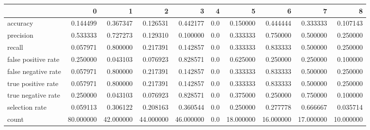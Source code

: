 \begin{tabular}{lrrrrrrrrr}
\toprule
{} &          0 &          1 &          2 &          3 &    4 &          5 &          6 &          7 &          8 \\
\midrule
accuracy            &   0.144499 &   0.367347 &   0.126531 &   0.442177 &  0.0 &   0.150000 &   0.444444 &   0.333333 &   0.107143 \\
precision           &   0.533333 &   0.727273 &   0.129310 &   0.100000 &  0.0 &   0.333333 &   0.750000 &   0.500000 &   0.250000 \\
recall              &   0.057971 &   0.800000 &   0.217391 &   0.142857 &  0.0 &   0.333333 &   0.833333 &   0.500000 &   0.250000 \\
false positive rate &   0.250000 &   0.043103 &   0.076923 &   0.828571 &  0.0 &   0.625000 &   0.250000 &   0.250000 &   0.100000 \\
false negative rate &   0.057971 &   0.800000 &   0.217391 &   0.142857 &  0.0 &   0.333333 &   0.833333 &   0.500000 &   0.250000 \\
true positive rate  &   0.057971 &   0.800000 &   0.217391 &   0.142857 &  0.0 &   0.333333 &   0.833333 &   0.500000 &   0.250000 \\
true negative rate  &   0.250000 &   0.043103 &   0.076923 &   0.828571 &  0.0 &   0.375000 &   0.250000 &   0.750000 &   0.100000 \\
selection rate      &   0.059113 &   0.306122 &   0.208163 &   0.360544 &  0.0 &   0.250000 &   0.277778 &   0.666667 &   0.035714 \\
count               &  80.000000 &  42.000000 &  44.000000 &  46.000000 &  0.0 &  18.000000 &  16.000000 &  17.000000 &  10.000000 \\
\bottomrule
\end{tabular}
